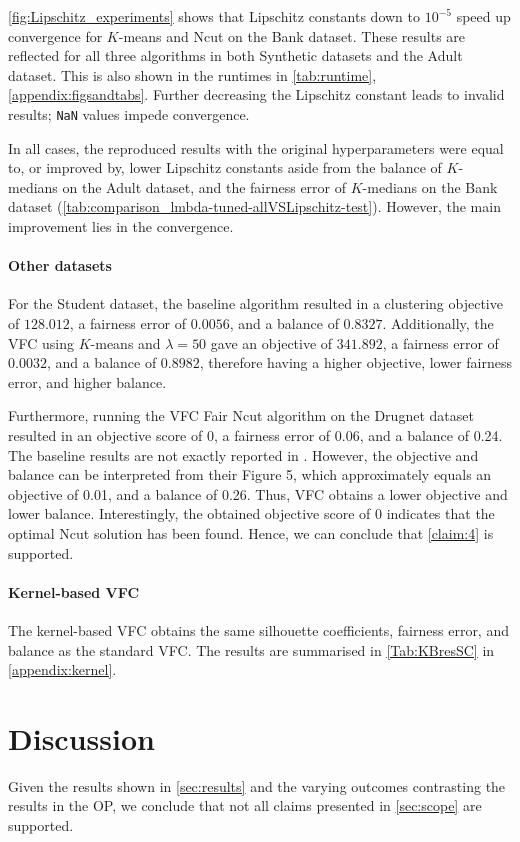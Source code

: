 \autoref{fig:Lipschitz_experiments} shows that Lipschitz constants down to $10^{-5}$ speed up convergence for $K$-means and Ncut on the Bank dataset. These results are reflected for all three algorithms in both Synthetic datasets and the Adult dataset. This is also shown in the runtimes in \autoref{tab:runtime}, \autoref{appendix:figsandtabs}. Further decreasing the Lipschitz constant leads to invalid results; \verb+NaN+ values impede convergence. 

In all cases, the reproduced results with the original hyperparameters were equal to, or improved by, lower Lipschitz constants aside from the balance of $K$-medians on the Adult dataset, and the fairness error of $K$-medians on the Bank dataset (\autoref{tab:comparison_lmbda-tuned-allVSLipschitz-test}). However, the main improvement lies in the convergence.

\paragraph{Other datasets}
For the Student dataset, the baseline algorithm resulted in a clustering objective of $128.012$, a fairness error of $0.0056$, and a balance of $0.8327$. Additionally, the VFC using $K$-means and $\lambda = 50$ gave an objective of $341.892$, a fairness error of $0.0032$, and a balance of $0.8982$, therefore having a higher objective, lower fairness error, and higher balance.

Furthermore, running the VFC Fair Ncut algorithm on the Drugnet dataset resulted in an objective score of 0, a fairness error of 0.06, and a balance of 0.24. The baseline results are not exactly reported in \cite{kleindessner2019guarantees}. However, the objective and balance can be interpreted from their Figure 5, which approximately equals an objective of 0.01, and a balance of 0.26. Thus, VFC obtains a lower objective and lower balance. Interestingly, the obtained objective score of 0 indicates that the optimal Ncut solution has been found. Hence, we can conclude that \ref{claim:4} is supported.

\paragraph{Kernel-based VFC}
The kernel-based VFC obtains the same silhouette coefficients, fairness error, and balance as the standard VFC. The results are summarised in \autoref{Tab:KBresSC} in \autoref{appendix:kernel}.

\section{Discussion}
Given the results shown in \autoref{sec:results} and the varying outcomes contrasting the results in the OP, we conclude that not all claims presented in \autoref{sec:scope} are supported. 
